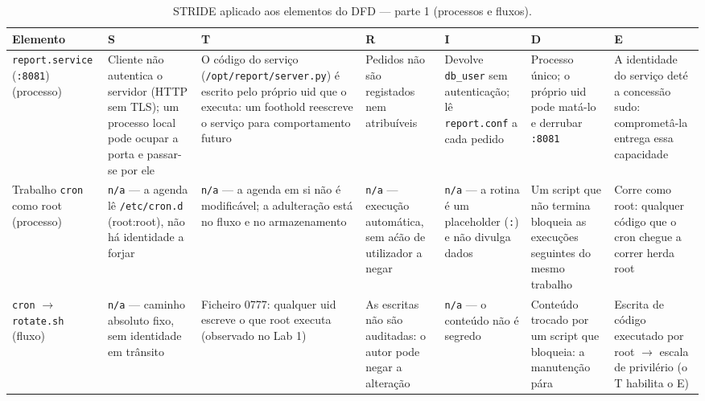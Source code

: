\documentclass[a4paper,11pt]{article}
\newcommand{\cmd}[1]{\textcolor{sscnblue}{\texttt{#1}}}
\begin{document}
\begin{table}[H]
\centering
\caption{STRIDE aplicado aos elementos do DFD --- parte 1 (processos e fluxos).}
\label{tab:stride1}
\scriptsize
\setlength{\tabcolsep}{3pt}
\renewcommand{\arraystretch}{1.2}
\begin{tabular}{@{}>{\raggedright\arraybackslash}p{2.5cm} >{\raggedright\arraybackslash}p{2.25cm} >{\raggedright\arraybackslash}p{2.25cm} >{\raggedright\arraybackslash}p{2.25cm} >{\raggedright\arraybackslash}p{2.25cm} >{\raggedright\arraybackslash}p{2.25cm} >{\raggedright\arraybackslash}p{2.25cm}@{}}
\toprule
\textbf{Elemento} & \textbf{S} & \textbf{T} & \textbf{R} & \textbf{I} & \textbf{D} & \textbf{E} \\
\midrule
\rowcolor{sscbg}
\texttt{report.service} (\texttt{:8081}) (processo) &
Cliente n\~{a}o autentica o servidor (HTTP sem TLS); um processo local pode ocupar a porta e passar-se por ele &
O c\'{o}digo do servi\c{c}o (\texttt{/opt/report/server.py}) \'e escrito pelo pr\'{o}prio uid que o executa: um foothold reescreve o servi\c{c}o para comportamento futuro &
Pedidos n\~{a}o s\~{a}o registados nem atribu\'{i}veis &
Devolve \texttt{db\_user} sem autentica\c{c}\~{a}o; l\^{e} \texttt{report.conf} a cada pedido &
Processo \'unico; o pr\'{o}prio uid pode mat\'{a}-lo e derrubar \texttt{:8081} &
A identidade do servi\c{c}o det\'{e} a concess\~{a}o sudo: compromet\^{a}-la entrega essa capacidade \\
\midrule
Trabalho \texttt{cron} como root (processo) &
\cmd{n/a} --- a agenda l\^{e} \texttt{/etc/cron.d} (root:root), n\~{a}o h\'a identidade a forjar &
\cmd{n/a} --- a agenda em si n\~{a}o \'e modific\'{a}vel; a adultera\c{c}\~{a}o est\'a no fluxo e no armazenamento &
\cmd{n/a} --- execu\c{c}\~{a}o autom\'{a}tica, sem a\'{c}\~{a}o de utilizador a negar &
\cmd{n/a} --- a rotina \'e um placeholder (\cmd{:}) e n\~{a}o divulga dados &
Um script que n\~{a}o termina bloqueia as execu\c{c}\~{o}es seguintes do mesmo trabalho &
Corre como root: qualquer c\'{o}digo que o cron chegue a correr herda root \\
\rowcolor{sscbg}
\cmd{cron} $\rightarrow$ \cmd{rotate.sh} (fluxo) &
\cmd{n/a} --- caminho absoluto fixo, sem identidade em tr\^ansito &
Ficheiro 0777: qualquer uid escreve o que root executa (observado no Lab 1) &
As escritas n\~{a}o s\~{a}o auditadas: o autor pode negar a altera\c{c}\~{a}o &
\cmd{n/a} --- o conte\'{u}do n\~{a}o \'e segredo &
Conte\'{u}do trocado por um script que bloqueia: a manuten\c{c}\~{a}o p\'{a}ra &
Escrita de c\'{o}digo executado por root $\rightarrow$ escala de privil\'{e}rio (o T habilita o E) \\

\end{tabular}
\end{table}
\end{document}
